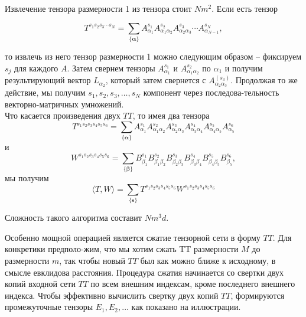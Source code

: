 Извлечение тензора размерности 1 из тензора стоит $Nm^2$. Если есть тензор 

\begin{equation}
T^{s_1 s_2 s_3 \cdots s_N} = \sum_{\{\mathbf{\alpha}\}} 
A^{s_1}_{\alpha_1} 
A^{s_2}_{\alpha_1 \alpha_2}
A^{s_3}_{\alpha_2 \alpha_3} 
\cdots
A^{s_N}_{\alpha_{N-1}},
\end{equation}

то извлечь из него тензор размерности 1 можно следующим образом -- фиксируем $s_j$ для каждого $A$. Затем свернем тензоры $A^{s_1}_{\alpha_1}$ и $A^{s_2}_{\alpha_1 \alpha_2}$ по $\alpha_1$ и получим результирующий вектор $L_{\alpha_2}$, который затем свернется с $A^{(s_3)}_{\alpha_2 \alpha_3}$. Продолжая то же действие, мы получим $s_1,s_2,s_3,\ldots,s_N$ компонент через последова-тельность векторно-матричных умножений.\\

Что касается произведения двух $\textit{TT}$, то имея два тензора \begin{equation}
T^{s_1 s_2 s_3 s_4 s_5 s_6} = \sum_{\{\mathbf{\alpha}\}} 
A^{s_1}_{\alpha_1} 
A^{s_2}_{\alpha_1 \alpha_2}
A^{s_3}_{\alpha_2 \alpha_3} 
A^{s_4}_{\alpha_3 \alpha_4} 
A^{s_5}_{\alpha_4 \alpha_5} 
A^{s_6}_{\alpha_5}
\end{equation} и 
\begin{equation}
W^{s_1 s_2 s_3 s_4 s_5 s_6} = \sum_{\{\mathbf{\beta}\}} 
B^{s_1}_{\beta_1} 
B^{s_2}_{\beta_1 \beta_2}
B^{s_3}_{\beta_2 \beta_3} 
B^{s_4}_{\beta_3 \beta_4} 
B^{s_5}_{\beta_4 \beta_5} 
B^{s_6}_{\beta_5},
\end{equation} мы получим 
\begin{equation}
\langle T, W\rangle =
\sum_{\{\mathbf{s}\}} 
T^{s_1 s_2 s_3 s_4 s_5 s_6} 
W^{s_1 s_2 s_3 s_4 s_5 s_6} 
\end{equation}

Сложность такого алгоритма составит $Nm^3d$.



Особенно мощной операцией является сжатие тензорной сети в форму $\textit{TT}$. Для конкретики предполо-жим, что  мы хотим сжать TT размерности $M$  до размерности $m$, так чтобы новый $\textit{TT}$ был как можно ближе к исходному, в смысле евклидова расстояния. Процедура сжатия начинается со свертки двух копий входной сети $\textit{TT}$ по всем внешним индексам, кроме последнего внешнего индекса.
Чтобы эффективно вычислить свертку двух копий $\textit{TT}$, формируются промежуточные тензоры $E_1, E_2,...$  как показано на иллюстрации.

